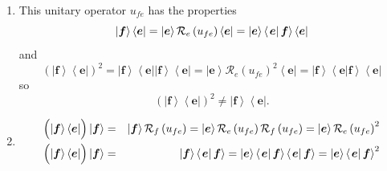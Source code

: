 \documentclass[aps,preprint]{revtex4}
\begin{document}
\begin{enumerate}
\item This unitary operator $u_{fe}$ has the properties%
\begin{equation}
\left\vert \boldsymbol{f}\right\rangle \left\langle \boldsymbol{e}%
\right\vert =\left\vert \boldsymbol{e}\right\rangle \mathcal{R}_{e}\left(
u_{fe}\right) \left\langle \boldsymbol{e}\right\vert =\left\vert \boldsymbol{%
e}\right\rangle \left\langle \left. \overset{}{\boldsymbol{e}}\right\vert 
\boldsymbol{f}\right\rangle \left\langle \boldsymbol{e}\right\vert
\end{equation}%
and 
\begin{equation}
\left( \left\vert \boldsymbol{f}\right\rangle \left\langle \boldsymbol{e}%
\right\vert \right) ^{2}=\left\vert \boldsymbol{f}\right\rangle \left\langle 
\boldsymbol{e}\right\vert \left\vert \boldsymbol{f}\right\rangle
\left\langle \boldsymbol{e}\right\vert =\left\vert \boldsymbol{e}%
\right\rangle \mathcal{R}_{e}\left( u_{fe}\right) ^{2}\left\langle 
\boldsymbol{e}\right\vert =\left\vert \boldsymbol{f}\right\rangle
\left\langle \left. \overset{}{\boldsymbol{e}}\right\vert \boldsymbol{f}%
\right\rangle \left\langle \boldsymbol{e}\right\vert
\end{equation}%
so 
\begin{equation}
\left( \left\vert \boldsymbol{f}\right\rangle \left\langle \boldsymbol{e}%
\right\vert \right) ^{2}\neq \left\vert \boldsymbol{f}\right\rangle
\left\langle \boldsymbol{e}\right\vert .
\end{equation}

\item 
\begin{eqnarray}
\left( \overset{}{\left\vert \boldsymbol{f}\right\rangle \left\langle 
\boldsymbol{e}\right\vert }\right) \left\vert \boldsymbol{f}\right\rangle
&=&\left\vert \boldsymbol{f}\right\rangle \mathcal{R}_{f}\left(
u_{fe}\right) =\left\vert \boldsymbol{e}\right\rangle \mathcal{R}_{e}\left(
u_{fe}\right) \mathcal{R}_{f}\left( u_{fe}\right) =\left\vert \boldsymbol{e}%
\right\rangle \mathcal{R}_{e}\left( u_{fe}\right) ^{2} \\
\left( \overset{}{\left\vert \boldsymbol{f}\right\rangle \left\langle 
\boldsymbol{e}\right\vert }\right) \left\vert \boldsymbol{f}\right\rangle
&=&\left\vert \boldsymbol{f}\right\rangle \left\langle \left. \overset{}{%
\boldsymbol{e}}\right\vert \boldsymbol{f}\right\rangle =\left\vert 
\boldsymbol{e}\right\rangle \left\langle \left. \overset{}{\boldsymbol{e}}%
\right\vert \boldsymbol{f}\right\rangle \left\langle \left. \overset{}{%
\boldsymbol{e}}\right\vert \boldsymbol{f}\right\rangle =\left\vert 
\boldsymbol{e}\right\rangle \left\langle \left. \overset{}{\boldsymbol{e}}%
\right\vert \boldsymbol{f}\right\rangle ^{2}
\end{eqnarray}


\end{enumerate}
\end{document}
